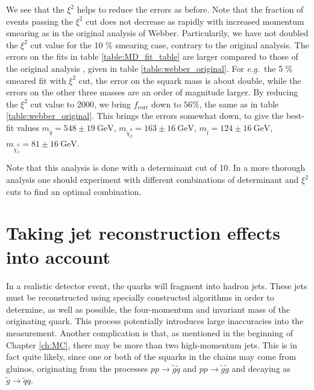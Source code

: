 \documentclass[twoside,english]{uiofysmaster}
\begin{document}
We see that the $\xi^2$ helps to reduce the errors as before. Note that the fraction of events passing the $\xi^2$ cut does not decrease as rapidly with increased momentum smearing as in the original analysis of Webber. Particularily, we have not doubled the $\xi^2$ cut value for the 10 \% smearing case, contrary to the original analysis. The errors on the fits in table \ref{table:MD_fit_table} are larger compared to those of the original analysis \cite{Webber:2009vm}, given in table \ref{table:webber_original}. For {\it e.g.}\ the 5 \% smeared fit with $\xi^2$ cut, the error on the squark mass is about double, while the errors on the other three masses are an order of magnitude larger. By reducing the $\xi^2$ cut value to 2000, we bring $f_{\mathrm{corr}}$ down to $56 \%$, the same as in table \ref{table:webber_original}. This brings the errors somewhat down, to give the best-fit values $m_{\tilde q} = 548\pm19~\mathrm{GeV}$, $m_{\tilde \chi_2^0}=163\pm16~\mathrm{GeV}$, $m_{\tilde l} = 124\pm16~\mathrm{GeV}$, $m_{\tilde \chi_1^0} = 81\pm16~\mathrm{GeV}$.

Note that this analysis is done with a determinant cut of 10. In a more thorough analysis one should experiment with different combinations of determinant and $\xi^2$ cuts to find an optimal combination.

\section{Taking jet reconstruction effects into account}
In a realistic detector event, the quarks will fragment into hadron jets. These jets must be reconstructed using specially constructed algorithms in order to determine, as well as possible, the four-momentum and invariant mass of the originating quark. This process potentially introduces large inaccuracies into the measurement. Another complication is that, as mentioned in the beginning of Chapter \ref{ch:MC}, there may be more than two high-momentum jets. This is in fact quite likely, since one or both of the squarks in the chains may come from gluinos, originating from the processes $pp \to \tilde g \tilde q$ and $pp \to \tilde g \tilde g$ and decaying as $\tilde g \to \tilde q q$. 
\end{document}
